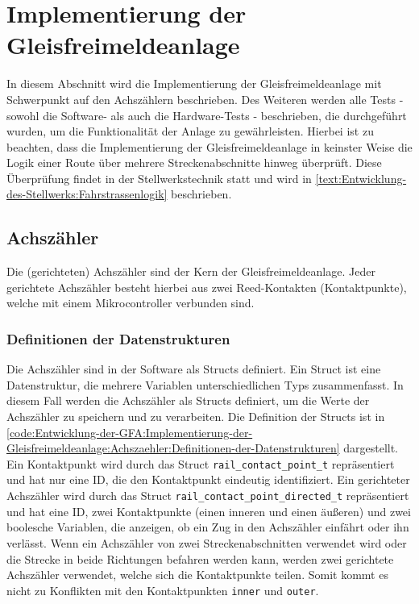 \section{Implementierung der Gleisfreimeldeanlage}\label{text:Entwicklung-der-GFA:Implementierung-der-Gleisfreimeldeanlage}

In diesem Abschnitt wird die Implementierung der Gleisfreimeldeanlage mit Schwerpunkt auf den Achszählern beschrieben. Des Weiteren werden alle Tests - sowohl die Software- als auch die Hardware-Tests - beschrieben, die durchgeführt wurden, um die Funktionalität der Anlage zu gewährleisten. Hierbei ist zu beachten, dass die Implementierung der Gleisfreimeldeanlage in keinster Weise die Logik einer Route über mehrere Streckenabschnitte hinweg überprüft. Diese Überprüfung findet in der Stellwerkstechnik statt und wird in \autoref{text:Entwicklung-des-Stellwerks:Fahrstrassenlogik}  beschrieben.

\subsection{Achszähler}\label{text:Entwicklung-der-GFA:Implementierung-der-Gleisfreimeldeanlage:Achszähler}

Die (gerichteten) Achszähler sind der Kern der Gleisfreimeldeanlage. Jeder gerichtete Achszähler besteht hierbei aus zwei Reed-Kontakten (Kontaktpunkte), welche mit einem Mikrocontroller verbunden sind.

\subsubsection{Definitionen der Datenstrukturen}\label{text:Entwicklung-der-GFA:Implementierung-der-Gleisfreimeldeanlage:Achszähler:Definitionen-der-Datenstrukturen}

Die Achszähler sind in der Software als Structs definiert. Ein Struct ist eine Datenstruktur, die mehrere Variablen unterschiedlichen Typs zusammenfasst. In diesem Fall werden die Achszähler als Structs definiert, um die Werte der Achszähler zu speichern und zu verarbeiten. Die Definition der Structs ist in \autoref{code:Entwicklung-der-GFA:Implementierung-der-Gleisfreimeldeanlage:Achszaehler:Definitionen-der-Datenstrukturen} dargestellt. Ein Kontaktpunkt wird durch das Struct \texttt{rail\_contact\_point\_t} repräsentiert und hat nur eine ID, die den Kontaktpunkt eindeutig identifiziert. Ein gerichteter Achszähler wird durch das Struct \texttt{rail\_contact\_point\_directed\_t} repräsentiert und hat eine ID, zwei Kontaktpunkte (einen inneren und einen äußeren) und zwei boolesche Variablen, die anzeigen, ob ein Zug in den Achszähler einfährt oder ihn verlässt.
\newline
Wenn ein Achszähler von zwei Streckenabschnitten verwendet wird oder die Strecke in beide Richtungen befahren werden kann, werden zwei gerichtete Achszähler verwendet, welche sich die Kontaktpunkte teilen. Somit kommt es nicht zu Konflikten mit den Kontaktpunkten \texttt{inner} und \texttt{outer}.

